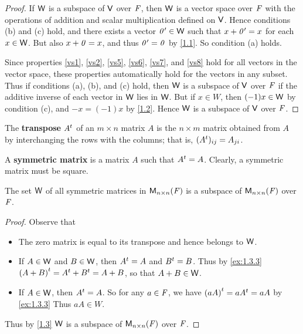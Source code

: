 \begin{proof}
  If \(\mathsf{W}\) is a subspace of \(\mathsf{V}\) over \(\mathit{F}\), then \(\mathsf{W}\) is a vector space over \(\mathit{F}\) with the operations of addition and scalar multiplication defined on \(\mathsf{V}\).
  Hence conditions (b) and (c) hold, and there exists a vector \(\mathit{0}' \in \mathsf{W}\) such that \(x + \mathit{0}' = x\) for each \(x \in \mathsf{W}\).
  But also \(x + \mathit{0} = x\), and thus \(\mathit{0}' = \mathit{0}\) by \cref{1.1}.
  So condition (a) holds.

  Since properties \ref{vs1}, \ref{vs2}, \ref{vs5}, \ref{vs6}, \ref{vs7}, and \ref{vs8} hold for all vectors in the vector space, these properties automatically hold for the vectors in any subset.
  Thus if conditions (a), (b), and (c) hold, then \(\mathsf{W}\) is a subspace of \(\mathsf{V}\) over \(\mathit{F}\) if the additive inverse of each vector in \(\mathsf{W}\) lies in \(\mathsf{W}\).
  But if \(x \in W\), then \((-1) x \in \mathsf{W}\) by condition (c), and \(-x = (-1) x\) by \cref{1.2}.
  Hence \(\mathsf{W}\) is a subspace of \(\mathsf{V}\) over \(\mathit{F}\).
\end{proof}

\begin{defn}\label{1.3.3}
  The \textbf{transpose} \({A}^{t}\) of an \(m \times n\) matrix \(A\) is the \(n \times m\) matrix obtained from \(A\) by interchanging the rows with the columns;
  that is, \(({A}^{t})_{i j} = A_{j i}\).
\end{defn}

\begin{defn}\label{1.3.4}
  A \textbf{symmetric matrix} is a matrix \(A\) such that \({A}^{t} = A\).
  Clearly, a symmetric matrix must be square.
\end{defn}

\begin{eg}\label{1.3.5}
  The set \(\mathsf{W}\) of all symmetric matrices in \(\mathsf{M}_{{n} \times n}({\mathit{F}})\) is a subspace of \(\mathsf{M}_{{n} \times n}({\mathit{F}})\) over \(\mathit{F}\).
\end{eg}

\begin{proof}
  Observe that
  \begin{itemize}
    \item The zero matrix is equal to its transpose and hence belongs to \(\mathsf{W}\).
    \item If \(A \in \mathsf{W}\) and \(B \in \mathsf{W}\), then \({A}^{t} = A\) and \({B}^{t} = B\).
          Thus by \cref{ex:1.3.3} \({(A + B)}^{t} = {A}^{t} + {B}^{t} = A + B\), so that \(A + B \in \mathsf{W}\).
    \item If \(A \in \mathsf{W}\), then \({A}^{t} = A\).
          So for any \(a \in \mathit{F}\), we have \({(aA)}^{t} = a{A}^{t} = aA\) by \cref{ex:1.3.3}
          Thus \(aA \in W\).
  \end{itemize}
  Thus by \cref{1.3} \(\mathsf{W}\) is a subspace of \(\mathsf{M}_{{n} \times n}({\mathit{F}})\) over \(\mathit{F}\).
\end{proof}

